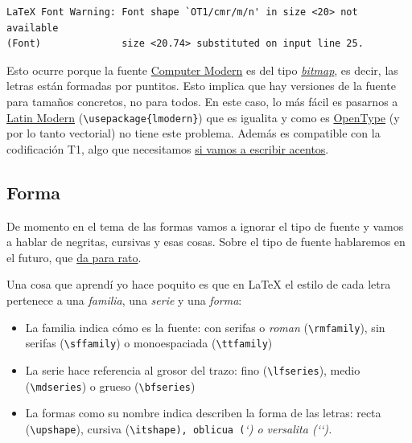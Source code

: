 \begin{lstlisting}[language={[latex]tex}]
LaTeX Font Warning: Font shape `OT1/cmr/m/n' in size <20> not available
(Font)              size <20.74> substituted on input line 25.
\end{lstlisting}

Esto ocurre porque la fuente
\href{https://en.wikipedia.org/wiki/Computer_Modern}{Computer Modern} es
del tipo
\href{https://en.wikipedia.org/wiki/Computer_font\#Bitmap_fonts}{\emph{bitmap}},
es decir, las letras están formadas por puntitos. Esto implica que hay
versiones de la fuente para tamaños concretos, no para todos. En este
caso, lo más fácil es pasarnos a
\href{http://www.gust.org.pl/projects/e-foundry/latin-modern}{Latin
Modern} (\lstinline!\usepackage{lmodern}!) que es igualita y como es
\href{https://es.wikipedia.org/wiki/OpenType}{OpenType} (y por lo tanto
vectorial) no tiene este problema. Además es compatible con la
codificación T1, algo que necesitamos
\href{https://ondahostil.wordpress.com/2017/02/21/curso-no-convencional-de-latex-a-vueltas-con-el-idioma/}{si
vamos a escribir acentos}.

\subsection{Forma}\label{sec:forma}

De momento en el tema de las formas vamos a ignorar el tipo de fuente y
vamos a hablar de negritas, cursivas y esas cosas. Sobre el tipo de
fuente hablaremos en el futuro, que
\href{https://ondahostil.wordpress.com/2016/12/03/lo-que-he-aprendido-escribir-una-carta-en-latex/}{da
para rato}.

Una cosa que aprendí yo hace poquito es que en LaTeX el estilo de cada
letra pertenece a una \emph{familia}, una \emph{serie} y una
\emph{forma}:

\begin{itemize}
\itemsep1pt\parskip0pt
\item
  La familia indica cómo es la fuente: con serifas o \emph{roman}
  (\lstinline!\rmfamily!), sin serifas (\lstinline!\sffamily!) o
  monoespaciada (\lstinline!\ttfamily!)
\item
  La serie hace referencia al grosor del trazo: fino
  (\lstinline!\lfseries!), medio (\lstinline!\mdseries!) o grueso
  (\lstinline!\bfseries!)
\item
  La formas como su nombre indica describen la forma de las letras:
  recta (\lstinline!\upshape!), cursiva
  (\lstinline!\itshape), oblicua (!\slshape`) o
    versalita (`\scshape`).
\end{itemize}

